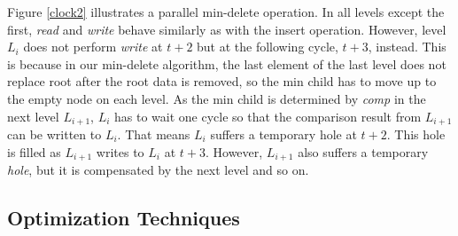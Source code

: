 \documentclass[10pt, conference, compsocconf]{IEEEtran}
\begin{document}
Figure \ref{clock2} illustrates a parallel min-delete operation. 
In all levels except the first, {\it read} and {\it write} behave similarly as with the insert operation.
However, level $L_i$ does not perform {\it write} at $t+2$ but at the following cycle, $t+3$, instead.
This is because in our min-delete algorithm, the last element of the last level does not replace root after the root data is removed, so the min child has to move up to the empty node on each level.
As the min child is determined by {\it comp} in the next level $L_{i+1}$, $L_i$ has to wait one cycle so that the comparison result from $L_{i+1}$ can be written to $L_i$.
That means $L_i$ suffers a temporary hole at $t+2$.
This hole is filled as $L_{i+1}$ writes to $L_i$ at $t+3$.
However, $L_{i+1}$ also suffers a temporary {\it hole}, but it is compensated by the next level and so on.


\subsection{Optimization Techniques}
%
\end{document}
